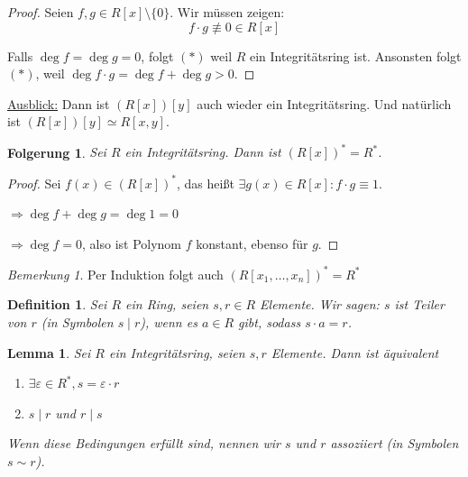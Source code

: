 \documentclass[a4paper,12pt,numbers=noenddot,parskip=full]{scrartcl}
\newcommand{\heading}{\underline}
\theoremstyle{dotless}
\newtheorem{corollary}[theorem]{Folgerung}
\newtheorem{lemma}[theorem]{Lemma}
\newtheorem{definition}[theorem]{Definition}
\theoremstyle{remark}
\newtheorem*{remark}{Bemerkung}
\begin{document}
 	\begin{proof}
 		Seien $f,g \in R[x] \setminus \{0\}$. 		
 		Wir müssen zeigen: 
 		\begin{equation*}
 			f \cdot g \not\equiv 0 \in R[x] \tag{$*$}
 		\end{equation*}
 		
 		Falls $\deg f = \deg g = 0$, folgt $(*)$ weil $R$ ein Integritätsring ist.
 		Ansonsten folgt $(*)$, weil $\deg f \cdot g = \deg f + \deg g > 0$.
 	\end{proof}
 
 	\heading{Ausblick:} Dann ist $(R[x])[y]$ auch wieder ein Integritätsring. Und natürlich ist $(R[x])[y] \simeq R[x,y]$.
 	
 	\begin{corollary}
 		Sei $R$ ein Integritätsring. Dann ist $(R[x])^* = R^*$.
 	\end{corollary}
 
 	\begin{proof}
 		Sei $f(x) \in (R[x])^*$, das heißt $\exists g(x) \in R[x]: f \cdot g \equiv 1$.
 		
 		$\Rightarrow \deg f + \deg g = \deg 1 = 0$
 		
 		$\Rightarrow \deg f = 0$, also ist Polynom $f$ konstant, ebenso für $g$. 
 	\end{proof}
 
 	\begin{remark}
 		Per Induktion folgt auch $(R[x_1, \dots, x_n])^* = R^*$
 	\end{remark}
 
 	\begin{definition}
 		Sei $R$ ein Ring, seien $s, r \in R$ Elemente. Wir sagen: $s$ ist Teiler von $r$ (in Symbolen $s \mid r$), wenn es $a \in R$ gibt, sodass $s \cdot a = r$.
 	\end{definition}
 
 	\begin{lemma}
 		Sei $R$ ein Integritätsring, seien $s,r$ Elemente. Dann ist äquivalent
 		\begin{enumerate}
 			\item $\exists \varepsilon \in R^*, s = \varepsilon \cdot r$
 			\item $s \mid r$ und $r \mid s$
 		\end{enumerate}
 	
 	Wenn diese Bedingungen erfüllt sind, nennen wir $s$ und $r$ \emph{assoziiert} (in Symbolen $s \sim r$).
 	\end{lemma}
 
\end{document}
